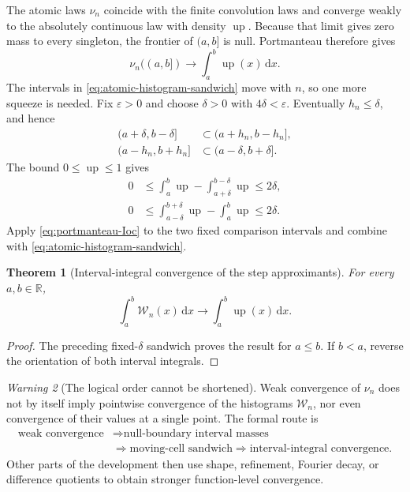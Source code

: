 \documentclass[11pt,oneside]{article}
\newtheorem{theorem}{Theorem}[section]
\theoremstyle{definition}
\theoremstyle{remark}
\newtheorem{warning}[theorem]{Warning}
\newcommand{\R}{\mathbb R}
\newcommand{\Up}{\operatorname{up}}
\newcommand{\dd}{\,\mathrm d}
\newcommand{\Wcal}{\mathcal W}
\begin{document}
The atomic laws $\nu_n$ coincide with the finite convolution laws and converge weakly to the
absolutely continuous law with density $\Up$.  Because that limit gives zero mass to every
singleton, the frontier of $(a,b]$ is null.  Portmanteau therefore gives
\begin{equation}
 \nu_n((a,b])\longrightarrow\int_a^b\Up(x)\dd x.
 \label{eq:portmanteau-Ioc}
\end{equation}
The intervals in \eqref{eq:atomic-histogram-sandwich} move with $n$, so one more squeeze is
needed.  Fix $\varepsilon>0$ and choose $\delta>0$ with $4\delta<\varepsilon$.  Eventually
$h_n\le\delta$, and hence
\begin{align}
 (a+\delta,b-\delta]&\subset(a+h_n,b-h_n],                 \label{eq:fixed-inner-subset}\\
 (a-h_n,b+h_n]&\subset(a-\delta,b+\delta].                 \label{eq:moving-outer-subset}
\end{align}
The bound $0\le\Up\le1$ gives
\begin{align}
 0&\le\int_a^b\Up-\int_{a+\delta}^{b-\delta}\Up\le2\delta, \label{eq:up-shrink-error}\\
 0&\le\int_{a-\delta}^{b+\delta}\Up-\int_a^b\Up\le2\delta. \label{eq:up-expand-error}
\end{align}
Apply \eqref{eq:portmanteau-Ioc} to the two fixed comparison intervals and combine with
\eqref{eq:atomic-histogram-sandwich}.

\begin{theorem}[Interval-integral convergence of the step approximants]
\label{thm:step-integral-convergence}
For every $a,b\in\R$,
\begin{equation}
 \int_a^b\Wcal_n(x)\dd x
 \longrightarrow
 \int_a^b\Up(x)\dd x.
 \label{eq:step-integral-convergence}
\end{equation}
\end{theorem}

\begin{proof}
The preceding fixed-$\delta$ sandwich proves the result for $a\le b$.  If $b<a$, reverse the
orientation of both interval integrals.
\end{proof}

\begin{warning}[The logical order cannot be shortened]
Weak convergence of $\nu_n$ does not by itself imply pointwise convergence of the
histograms $\Wcal_n$, nor even convergence of their values at a single point.  The formal
route is
\[
\begin{aligned}
 \text{weak convergence}
 &\Longrightarrow \text{null-boundary interval masses}\\
 &\Longrightarrow \text{moving-cell sandwich}
 \Longrightarrow \text{interval-integral convergence}.
\end{aligned}
\]
Other parts of the development then use shape, refinement, Fourier decay, or difference
quotients to obtain stronger function-level convergence.
\end{warning}
\end{document}
